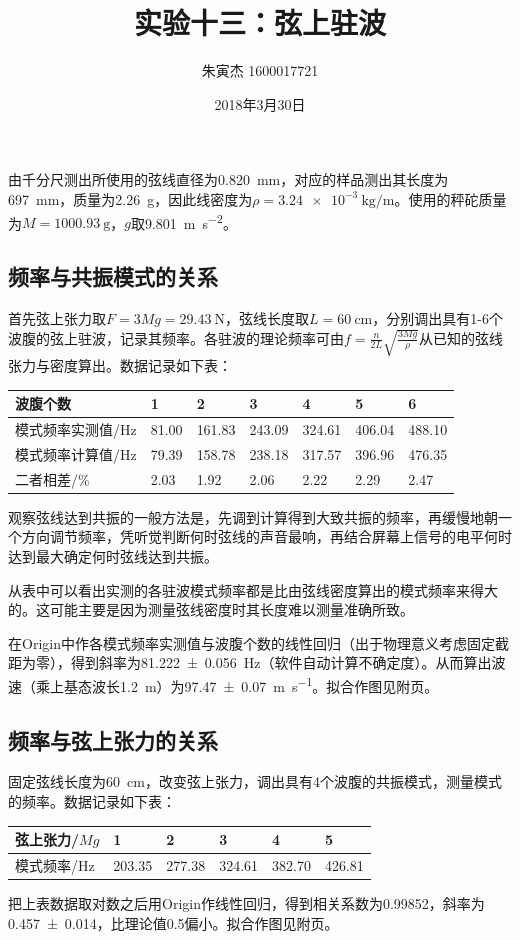 \documentclass[UTF8]{ctexart}
\title{实验十三：弦上驻波}
\author{朱寅杰 1600017721}
\date{2018年3月30日}
\begin{document}
\maketitle
\setcounter{section}{13}
由千分尺测出所使用的弦线直径为\SI{.820}{\mm}，对应的样品测出其长度为\SI{697}{\mm}，质量为\SI{2.26}{\g}，因此线密度为$\rho=\SI{3.24e-3}{\kg\per\m}$。使用的秤砣质量为$M=\SI{1000.93}{\g}$，$g$取\SI{9.801}{\meter\per\second\squared}。
\subsection{频率与共振模式的关系}
首先弦上张力取$F=3Mg=\SI{29.43}{\N}$，弦线长度取$L=\SI{60}{\cm}$，分别调出具有1-6个波腹的弦上驻波，记录其频率。各驻波的理论频率可由$f=\frac{n}{2L}\sqrt{\frac{3Mg}{\rho}}$从已知的弦线张力与密度算出。数据记录如下表：
\begin{center}
\begin{tabu}{X[c,-10]|X[c]X[c]X[c]X[c]X[c]X[c]}
\hline
波腹个数&1&2&3&4&5&6\\
\hline
模式频率实测值/Hz&81.00&161.83&243.09&324.61&406.04&488.10\\
模式频率计算值/Hz&79.39&158.78&238.18&317.57&396.96&476.35\\
二者相差/\%&2.03&1.92&2.06&2.22&2.29&2.47\\
\hline
\end{tabu}
\end{center}
观察弦线达到共振的一般方法是，先调到计算得到大致共振的频率，再缓慢地朝一个方向调节频率，凭听觉判断何时弦线的声音最响，再结合屏幕上信号的电平何时达到最大确定何时弦线达到共振。

从表中可以看出实测的各驻波模式频率都是比由弦线密度算出的模式频率来得大的。这可能主要是因为测量弦线密度时其长度难以测量准确所致。

在Origin中作各模式频率实测值与波腹个数的线性回归（出于物理意义考虑固定截距为零），得到斜率为\SI{81.222(56)}{\Hz}（软件自动计算不确定度）。从而算出波速（乘上基态波长\SI{1.2}{\m}）为\SI{97.47(7)}{\meter\per\second}。拟合作图见附页。
\subsection{频率与弦上张力的关系}
固定弦线长度为\SI{60}{\cm}，改变弦上张力，调出具有4个波腹的共振模式，测量模式的频率。数据记录如下表：
\begin{center}
\begin{tabu}{X[c]|X[c]X[c]X[c]X[c]X[c]}
\hline
弦上张力/$Mg$	&1&2&3&4&5\\
\hline
模式频率/Hz&203.35&277.38&324.61&382.70&426.81\\
\hline
\end{tabu}
\end{center}
把上表数据取对数之后用Origin作线性回归，得到相关系数为\num{.99852}，斜率为\num{.457(14)}，比理论值0.5偏小。拟合作图见附页。
\end{document}
